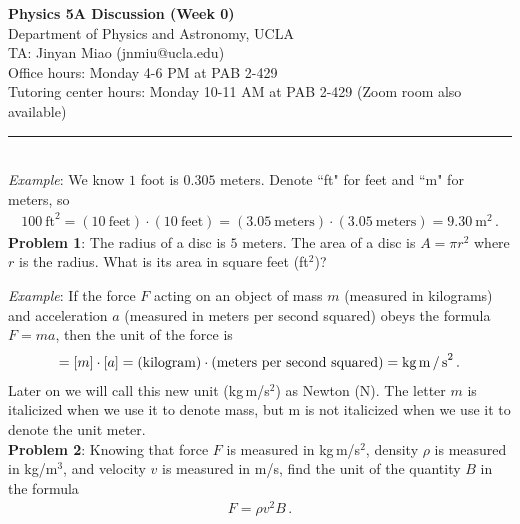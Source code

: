 \documentclass[11pt]{article}
\begin{document}
\Large \noindent \textbf{Physics 5A Discussion (Week 0)}\\
\normalsize
Department of Physics and Astronomy, UCLA\\

\noindent TA:  Jinyan Miao (jnmiu@ucla.edu)\\
Office hours: Monday 4-6 PM at PAB 2-429\\
Tutoring center hours: Monday 10-11 AM at PAB 2-429 (Zoom room also available)\\
\noindent\rule{8cm}{0.4pt}\\


\noindent\textit{Example}: We know $1$ foot is $0.305$ meters. Denote ``ft" for feet and ``m" for meters, so
\begin{align*}
100\ \text{ft}^2 = (10\ \text{feet})\cdot (10\ \text{feet}) = (  3.05\ \text{meters})\cdot  ( 3.05\ \text{meters})= 9.30\ \text{m}^2 \,.
\end{align*}
\noindent \textbf{Problem 1}: The radius of a disc is $5$ meters. The area of a disc is $A = \pi r^2$ where $r$ is the radius.  What is its area in square feet (ft$^2$)?\\
\newline\newline\newline
\newline\newline\newline
\newline\newline\newline


\noindent \textit{Example}: If the force $F$ acting on an object of mass $m$ (measured in kilograms) and acceleration $a$ (measured in meters per second squared) obeys the formula $F = ma$, then the unit of the force is
\begin{align*}
[F] = [m]\cdot [a] = \text{(kilogram)} \cdot \text{(meters per second squared)} = \text{kg\,m\,/\,s}^2\,.
\end{align*}
Later on we will call this new unit (kg\,m/s$^2$) as Newton (N).  The letter $m$ is italicized when we use it to denote mass, but m is not italicized when we use it to denote the unit meter.\\

\noindent \textbf{Problem 2}: Knowing that force $F$ is measured in kg\,m/s$^2$, density $\rho$ is measured in kg/m$^3$, and velocity $v$ is measured in m/s,  find the unit of the quantity $B$ in the  formula
\begin{align*}
F = \rho v^2 B\,.
\end{align*}
\newline\newline\newline
\newline\newline\newline
\newline\newline\newline
\end{document}
